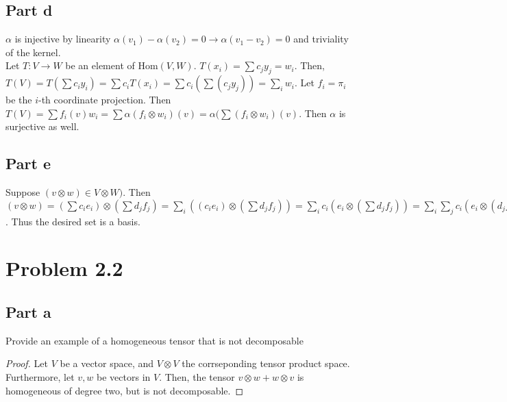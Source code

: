 \documentclass[paper=a4, fontsize=11pt]{scrartcl} %
\numberwithin{equation}{section} %
\numberwithin{figure}{section} %
\numberwithin{table}{section} %
\begin{document}
\subsection*{Part d}

$\alpha$ is injective by linearity $\alpha(v_1) - \alpha(v_2) = 0 \to \alpha(v_1 - v_2) = 0$ and triviality of the kernel. \\

Let $T: V \to W$ be an element of Hom$(V,W)$. $T(x_i) = \sum c_j y_j = w_i$. 
Then, $T(V) = T(\sum c_i y_i) = \sum c_i T(x_i)  = \sum c_i (\sum(c_j y_j))  = \sum_i w_i $. Let $f_i =  \pi_i$ be the $i$-th coordinate projection. 
Then $T(V) = \sum f_i(v) w_i = \sum\alpha(f_i \otimes w_i)(v) = \alpha(\sum(f_i \otimes w_i)(v).$ Then $\alpha$ is surjective as well. \\

\subsection*{Part e}

Suppose $(v \otimes w) \in V \otimes W)$.
Then $(v \otimes w) = (\sum c_i e_i) \otimes (\sum d_j f_j) = \sum_i((c_i e_i) \otimes (\sum d_j f_j)) =  \sum_ic_i (e_i \otimes (\sum d_j f_j)) =  \sum_i \sum_j c_i (e_i \otimes (d_j f_j)) = \sum_i \sum_j c_i d_j (e_i \otimes f_j)$. 
Thus the desired set is a basis.




\section*{Problem 2.2}
\subsection*{Part a}

Provide an example of a homogeneous tensor that is not decomposable

\begin{proof}
Let $V$ be a vector space, and $V \otimes V$ the corrseponding tensor product space.
Furthermore, let $v, w$ be vectors in $V$.
Then, the tensor $v \otimes w + w \otimes v$ is homogeneous of degree two, but is not decomposable.
\end{proof}
\end{document}
